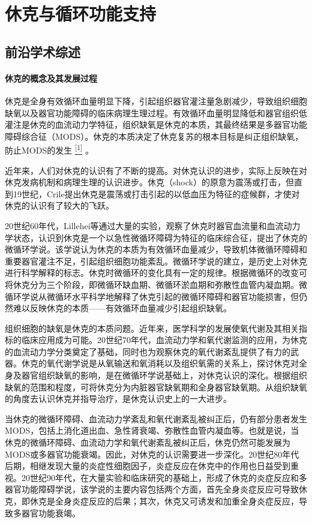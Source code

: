 \chapter{休克与循环功能支持}

\section{前沿学术综述}

\subsubsection{休克的概念及其发展过程}

休克是全身有效循环血量明显下降，引起组织器官灌注量急剧减少，导致组织细胞缺氧以及器官功能障碍的临床病理生理过程。有效循环血量明显降低和器官组织低灌注是休克的血流动力学特征，组织缺氧是休克的本质，其最终结果是多器官功能障碍综合征（MODS）。休克的本质决定了休克复苏的根本目标是纠正组织缺氧，防止MODS的发生
\protect\hyperlink{text00008.htmlux5cux23ch1-7}{\textsuperscript{{[}1{]}}}
。

近年来，人们对休克的认识有了不断的提高。对休克认识的进步，实际上反映在对休克发病机制和病理生理的认识进步。休克（shock）的原意为震荡或打击，但直到19世纪，Crile提出休克是震荡或打击引起的以低血压为特征的症候群，才使对休克的认识有了较大的飞跃。

20世纪60年代，Lillehei等通过大量的实验，观察了休克时器官血流量和血流动力学状态，认识到休克是一个以急性微循环障碍为特征的临床综合征，提出了休克的微循环学说。该学说认为休克的本质为有效循环血量减少，导致机体微循环障碍和重要器官灌注不足，引起组织细胞功能紊乱。微循环学说的建立，是历史上对休克进行科学解释的标志。休克时微循环的变化具有一定的规律。根据微循环的改变可将休克分为三个阶段，即微循环缺血期、微循环淤血期和弥散性血管内凝血期。微循环学说从微循环水平科学地解释了休克引起的微循环障碍和器官功能损害，但仍然难以反映休克的本质------有效循环血量减少引起组织缺氧。

组织细胞的缺氧是休克的本质问题。近年来，医学科学的发展使氧代谢及其相关指标的临床应用成为可能。20世纪70年代，血流动力学和氧代谢监测的应用，为休克的血流动力学分类奠定了基础，同时也为观察休克的氧代谢紊乱提供了有力的武器。休克的氧代谢学说是从氧输送和氧消耗以及组织氧需的关系上，探讨休克对全身及器官组织缺氧的影响，是在微循环学说基础上，对休克认识的深化。根据组织缺氧的范围和程度，可将休克分为内脏器官缺氧期和全身器官缺氧期。从组织缺氧的角度去认识休克并指导治疗，是休克认识史上的一大进步。

当休克的微循环障碍、血流动力学紊乱和氧代谢紊乱被纠正后，仍有部分患者发生MODS，包括上消化道出血、急性肾衰竭、弥散性血管内凝血等。也就是说，当休克的微循环障碍、血流动力学和氧代谢紊乱被纠正后，休克仍然可能发展为MODS或多器官功能衰竭。因此，对休克的认识需要进一步深化。20世纪80年代后期，相继发现大量的炎症性细胞因子，炎症反应在休克中的作用也日益受到重视。20世纪90年代，在大量实验和临床研究的基础上，形成了休克的炎症反应和多器官功能障碍学说，该学说的主要内容包括两个方面，首先全身炎症反应可导致休克，即休克是全身炎症反应的后果；其次，休克又可诱发和加重全身炎症反应，导致多器官功能衰竭。

